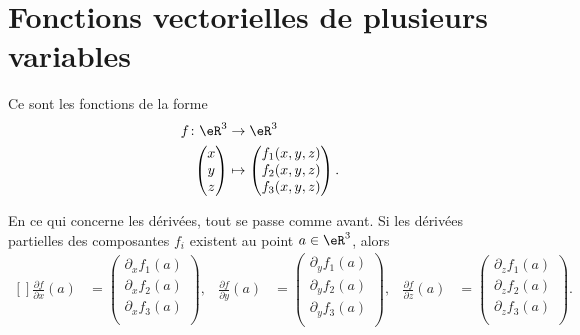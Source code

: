 \section{Fonctions vectorielles de plusieurs variables}

Ce sont les fonctions de la forme
\begin{equation}
	\begin{aligned}
		f\colon \eR^3               & \to \eR^3                            \\
		\begin{pmatrix}
			x \\
			y \\
			z
		\end{pmatrix} & \mapsto \begin{pmatrix}
			f_1(x,y,z) \\
			f_2(x,y,z) \\
			f_3(x,y,z)
		\end{pmatrix}.
	\end{aligned}
\end{equation}

En ce qui concerne les dérivées, tout se passe comme avant. Si les dérivées partielles des composantes \( f_i\) existent au point \( a\in\eR^3\), alors
\begin{equation}
	\begin{aligned}[]
		\frac{ \partial f }{ \partial x }(a) & =\begin{pmatrix}
			\partial_xf_1(a) \\
			\partial_xf_2(a) \\
			\partial_xf_3(a) \\
		\end{pmatrix}, &
		\frac{ \partial f }{ \partial y }(a) & =\begin{pmatrix}
			\partial_yf_1(a) \\
			\partial_yf_2(a) \\
			\partial_yf_3(a) \\
		\end{pmatrix}, &
		\frac{ \partial f }{ \partial z }(a) & =\begin{pmatrix}
			\partial_zf_1(a) \\
			\partial_zf_2(a) \\
			\partial_zf_3(a) \\
		\end{pmatrix}.
	\end{aligned}
\end{equation}

